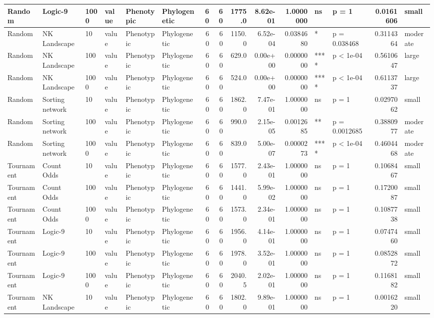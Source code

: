\documentclass[]{book}
\begin{document}
\begin{table}
\begin{tabular}[t]{l|l|l|l|l|l|r|r|r|r|r|l|l|r|l}
\hline
Random & Logic-9 & 1000 & value & Phenotypic & Phylogenetic & 60 & 60 & 1775.0 & 8.62e-01 & 1.0000000 & ns & p = 1 & 0.0161606 & small\\
\hline
Random & NK Landscape & 10 & value & Phenotypic & Phylogenetic & 60 & 60 & 1150.0 & 6.52e-04 & 0.0384680 & * & p = 0.038468 & 0.3114364 & moderate\\
\hline
Random & NK Landscape & 100 & value & Phenotypic & Phylogenetic & 60 & 60 & 629.0 & 0.00e+00 & 0.0000000 & **** & p < 1e-04 & 0.5610647 & large\\
\hline
Random & NK Landscape & 1000 & value & Phenotypic & Phylogenetic & 60 & 60 & 524.0 & 0.00e+00 & 0.0000000 & **** & p < 1e-04 & 0.6113737 & large\\
\hline
Random & Sorting network & 10 & value & Phenotypic & Phylogenetic & 60 & 60 & 1862.0 & 7.47e-01 & 1.0000000 & ns & p = 1 & 0.0297062 & small\\
\hline
Random & Sorting network & 100 & value & Phenotypic & Phylogenetic & 60 & 60 & 990.0 & 2.15e-05 & 0.0012685 & ** & p = 0.0012685 & 0.3880977 & moderate\\
\hline
Random & Sorting network & 1000 & value & Phenotypic & Phylogenetic & 60 & 60 & 839.0 & 5.00e-07 & 0.0000273 & **** & p < 1e-04 & 0.4604468 & moderate\\
\hline
Tournament & Count Odds & 10 & value & Phenotypic & Phylogenetic & 60 & 60 & 1577.0 & 2.43e-01 & 1.0000000 & ns & p = 1 & 0.1068467 & small\\
\hline
Tournament & Count Odds & 100 & value & Phenotypic & Phylogenetic & 60 & 60 & 1441.0 & 5.99e-02 & 1.0000000 & ns & p = 1 & 0.1720087 & small\\
\hline
Tournament & Count Odds & 1000 & value & Phenotypic & Phylogenetic & 60 & 60 & 1573.0 & 2.34e-01 & 1.0000000 & ns & p = 1 & 0.1087738 & small\\
\hline
Tournament & Logic-9 & 10 & value & Phenotypic & Phylogenetic & 60 & 60 & 1956.0 & 4.14e-01 & 1.0000000 & ns & p = 1 & 0.0747460 & small\\
\hline
Tournament & Logic-9 & 100 & value & Phenotypic & Phylogenetic & 60 & 60 & 1978.0 & 3.52e-01 & 1.0000000 & ns & p = 1 & 0.0852872 & small\\
\hline
Tournament & Logic-9 & 1000 & value & Phenotypic & Phylogenetic & 60 & 60 & 2040.5 & 2.02e-01 & 1.0000000 & ns & p = 1 & 0.1168182 & small\\
\hline
Tournament & NK Landscape & 10 & value & Phenotypic & Phylogenetic & 60 & 60 & 1802.0 & 9.89e-01 & 1.0000000 & ns & p = 1 & 0.0016220 & small\\

\end{tabular}
\end{table}
\end{document}
